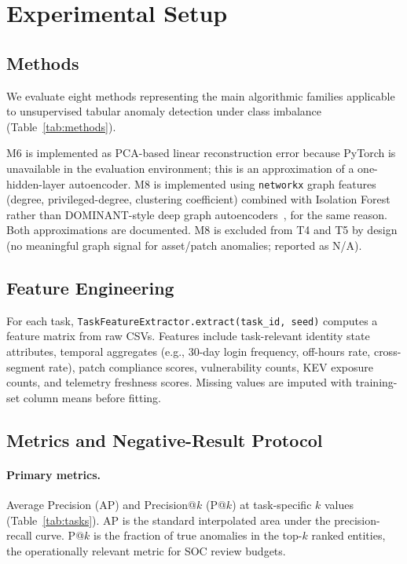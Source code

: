 
\section{Experimental Setup}
\label{sec:setup}

\subsection{Methods}

We evaluate eight methods representing the main algorithmic families applicable
to unsupervised tabular anomaly detection under class imbalance
(Table~\ref{tab:methods}).



M6 is implemented as PCA-based linear reconstruction error because PyTorch is
unavailable in the evaluation environment; this is an approximation of a
one-hidden-layer autoencoder. M8 is implemented using \texttt{networkx} graph features
(degree, privileged-degree, clustering coefficient) combined with Isolation
Forest rather than DOMINANT-style deep graph autoencoders~\cite{ding2019dominant},
for the same reason. Both approximations are documented. M8 is excluded from T4
and T5 by design (no meaningful graph signal for asset/patch anomalies; reported
as N/A).

\subsection{Feature Engineering}

For each task, \texttt{TaskFeatureExtractor.\allowbreak extract(task\_id, seed)} computes a
feature matrix from raw CSVs. Features include task-relevant identity state
attributes, temporal aggregates (e.g., 30-day login frequency, off-hours rate,
cross-segment rate), patch compliance scores, vulnerability counts, KEV exposure
counts, and telemetry freshness scores. Missing values are imputed with
training-set column means before fitting.

\subsection{Metrics and Negative-Result Protocol}

\paragraph{Primary metrics.}
Average Precision (AP) and Precision@$k$ (P@$k$) at task-specific $k$ values
(Table~\ref{tab:tasks}). AP is the standard interpolated area under the
precision-recall curve. P@$k$ is the fraction of true anomalies in the top-$k$
ranked entities, the operationally relevant metric for SOC review budgets.

